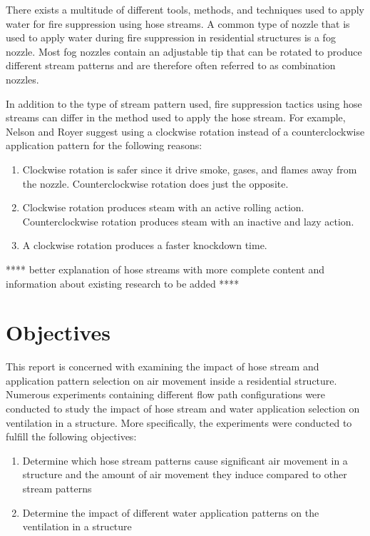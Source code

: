\documentclass[12pt,oneside]{book}
\begin{document}
There exists a multitude of different tools, methods, and techniques used to apply water for fire suppression using hose streams. A common type of nozzle that is used to apply water during fire suppression in residential structures is a fog nozzle. Most fog nozzles contain an adjustable tip that can be rotated to produce different stream patterns and are therefore often referred to as combination nozzles. 

In addition to the type of stream pattern used, fire suppression tactics using hose streams can differ in the method used to apply the hose stream. For example, Nelson and Royer suggest using a clockwise rotation instead of a counterclockwise application pattern for the following reasons:
\begin{enumerate} 
	\item Clockwise rotation is safer since it drive smoke, gases, and flames away from the nozzle. Counterclockwise rotation does just the opposite.
	\item Clockwise rotation produces steam with an active rolling action. Counterclockwise rotation produces steam with an inactive and lazy action.
	\item A clockwise rotation produces a faster knockdown time.
\end{enumerate}

**** better explanation of hose streams with more complete content and information about existing research to be added **** 

\section{Objectives}
\label{sec:objectives}
This report is concerned with examining the impact of hose stream and application pattern selection on air movement inside a residential structure. Numerous experiments containing different flow path configurations were conducted to study the impact of hose stream and water application selection on ventilation in a structure. More specifically, the experiments were conducted to fulfill the following objectives:
\begin{enumerate}
	\item Determine which hose stream patterns cause significant air movement in a structure and the amount of air movement they induce compared to other stream patterns
	\item Determine the impact of different water application patterns on the ventilation in a structure
\end{enumerate}
\end{document}
